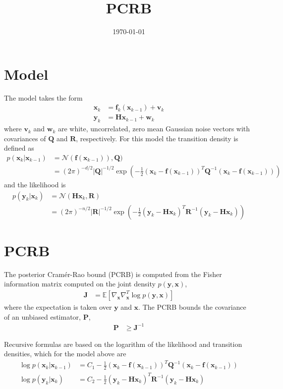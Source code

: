 \documentclass{article}
\title{PCRB}
\date{\today}
\renewcommand{\vec}[1]{\ensuremath{{\boldsymbol #1}}}
\newcommand{\mat}[1]{\ensuremath{\boldsymbol{#1}}}
\begin{document}
\section{Model}

The model takes the form
\begin{subequations}
	\label{eqn:model_general}
\begin{align}
	\vec x_k &= \vec f_k(\vec x_{k-1}) + \vec v_k \\
	\vec y_k &= \mat H\vec x_{k-1} + \vec w_k
\end{align}
\end{subequations}
where $\vec v_k$ and $\vec w_k$ are white, uncorrelated, zero mean Gaussian noise vectors with covariances of $\mat Q$ and $\mat R$, respectively. For this model the transition density is defined as
\begin{align}
	p(\vec x_k|\vec x_{k-1}) &= \mathcal N(\vec f(\vec x_{k-1})),\mat Q) \\
	&= (2\pi)^{-d/2} |\mat Q|^{-1/2} \exp\left(-\frac{1}{2}(\vec x_k - \vec f(\vec x_{k-1}))^T \mat Q^{-1} (\vec x_k - \vec f(\vec x_{k-1})) \right)
\end{align}
and the likelihood is
\begin{align}
	p(\vec y_k|\vec x_k) &= \mathcal N(\mat H\vec x_k,\mat R) \\
	&= (2\pi)^{-n/2} |\mat R|^{-1/2} \exp\left(-\frac{1}{2}(\vec y_k - \mat H\vec x_k)^T \mat R^{-1} (\vec y_k - \mat H\vec x_k) \right)
\end{align}

\section{PCRB}

The posterior Cram\'er-Rao bound (PCRB) is computed from the Fisher information matrix computed on the joint density $p(\vec y,\vec x)$,
\begin{align}
	\mat J &= \mathbb E\left[ \nabla_{\vec x}\nabla_{\vec x}^T \log p(\vec y,\vec x) \right]
\end{align}
where the expectation is taken over $\vec y$ and $\vec x$. The PCRB bounds the covariance of an unbiased estimator, $\mat P$,
\begin{align}
	\mat P &\ge \mat J^{-1}
\end{align}


Recursive formulas are based on the logarithm of the likelihood and transition densities, which for the model above are
\begin{align}
	\log p(\vec x_k|\vec x_{k-1}) &= C_1 -\frac{1}{2}(\vec x_k - \vec f(\vec x_{k-1}))^T \mat Q^{-1} (\vec x_k - \vec f(\vec x_{k-1})) \\
	\log p(\vec y_k|\vec x_k) &= C_2 -\frac{1}{2}(\vec y_k - \mat H\vec x_k)^T \mat R^{-1} (\vec y_k - \mat H\vec x_k)
\end{align}
\end{document}

